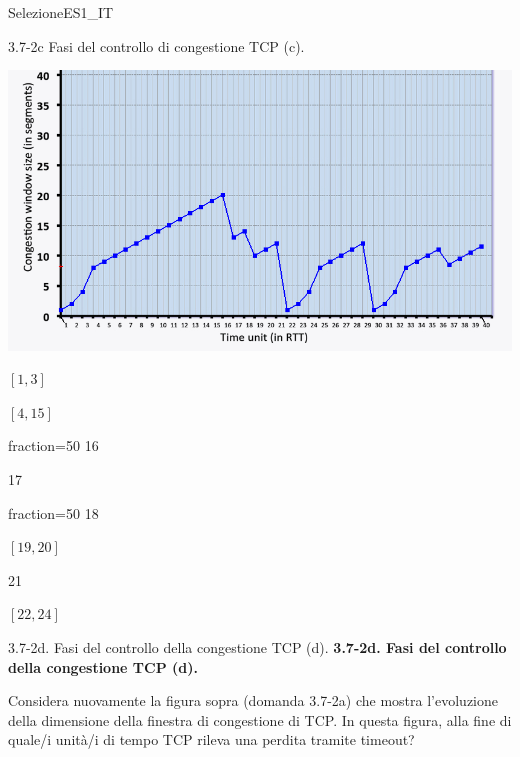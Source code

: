 \documentclass[a4paper]{article}
\begin{document}
\begin{quiz}{SelezioneES1\_IT}
\begin{multi}[points=1,shuffle,multiple]{3.7-2c Fasi del controllo di congestione TCP (c).}
\begin{center}
	\includegraphics[width=\linewidth]{figs/tcp_cc_evolution.jpg}
\end{center}
\item $[1,3]$
\item $[4,15]$
\item[fraction=50] 16
\item 17
\item[fraction=50] 18
\item $[19,20]$
\item 21
\item $[22,24]$
\end{multi}

\begin{multi}[points=1,shuffle]{3.7-2d. Fasi del controllo della congestione TCP (d).}
\textbf{3.7-2d. Fasi del controllo della congestione TCP (d).}

Considera nuovamente la figura sopra (domanda 3.7-2a) che mostra l'evoluzione della dimensione della finestra di congestione di TCP. In questa figura, alla fine di quale/i unità/i di tempo TCP rileva una perdita tramite timeout?


\end{multi}
\end{quiz}
\end{document}
